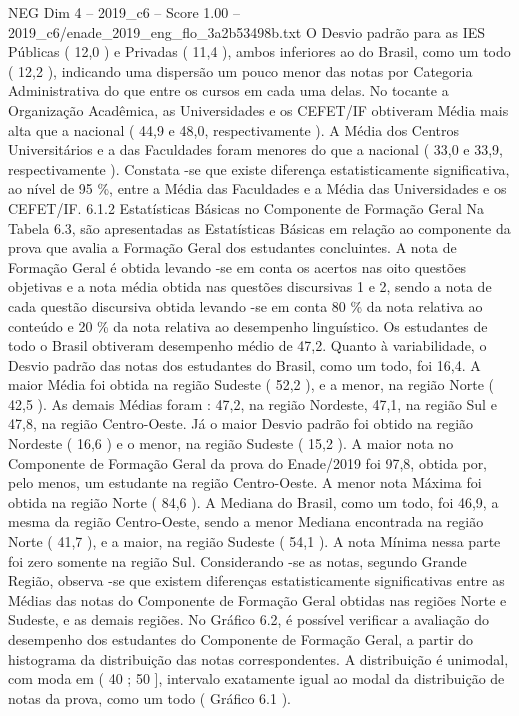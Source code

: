 \begin{textsample}{NEG Dim 4 – 2019\_c6 – Score 1.00 – 2019\_c6/enade\_2019\_eng\_flo\_3a2b53498b.txt}
O Desvio padrão para as IES Públicas ( 12,0 ) e Privadas ( 11,4 ), ambos inferiores ao do Brasil, como um todo ( 12,2 ), indicando uma dispersão um pouco menor das notas por Categoria Administrativa do que entre os cursos em cada uma delas.
No tocante a Organização Acadêmica, as Universidades e os CEFET/IF obtiveram Média mais alta que a nacional ( 44,9 e 48,0, respectivamente ).
A Média dos Centros Universitários e a das Faculdades foram menores do que a nacional ( 33,0 e 33,9, respectivamente ).
Constata -se que existe diferença estatisticamente significativa, ao nível de 95 \%, entre a Média das Faculdades e a Média das Universidades e os CEFET/IF. 6.1.2 Estatísticas Básicas no Componente de Formação Geral Na Tabela 6.3, são apresentadas as Estatísticas Básicas em relação ao componente da prova que avalia a Formação Geral dos estudantes concluintes.
A nota de Formação Geral é obtida levando -se em conta os acertos nas oito questões objetivas e a nota média obtida nas questões discursivas 1 e 2, sendo a nota de cada questão discursiva obtida levando -se em conta 80 \% da nota relativa ao conteúdo e 20 \% da nota relativa ao desempenho linguístico.
Os estudantes de todo o Brasil obtiveram desempenho médio de 47,2.
Quanto à variabilidade, o Desvio padrão das notas dos estudantes do Brasil, como um todo, foi 16,4.
A maior Média foi obtida na região Sudeste ( 52,2 ), e a menor, na região Norte ( 42,5 ).
As demais Médias foram : 47,2, na região Nordeste, 47,1, na região Sul e 47,8, na região Centro-Oeste.
Já o maior Desvio padrão foi obtido na região Nordeste ( 16,6 ) e o menor, na região Sudeste ( 15,2 ).
A maior nota no Componente de Formação Geral da prova do Enade/2019 foi 97,8, obtida por, pelo menos, um estudante na região Centro-Oeste.
A menor nota Máxima foi obtida na região Norte ( 84,6 ).
A Mediana do Brasil, como um todo, foi 46,9, a mesma da região Centro-Oeste, sendo a menor Mediana encontrada na região Norte ( 41,7 ), e a maior, na região Sudeste ( 54,1 ).
A nota Mínima nessa parte foi zero somente na região Sul.
Considerando -se as notas, segundo Grande Região, observa -se que existem diferenças estatisticamente significativas entre as Médias das notas do Componente de Formação Geral obtidas nas regiões Norte e Sudeste, e as demais regiões.
No Gráfico 6.2, é possível verificar a avaliação do desempenho dos estudantes do Componente de Formação Geral, a partir do histograma da distribuição das notas correspondentes.
A distribuição é unimodal, com moda em ( 40 ; 50 ], intervalo exatamente igual ao modal da distribuição de notas da prova, como um todo ( Gráfico 6.1 ).

\end{textsample}
